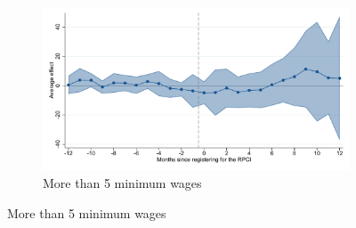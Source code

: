 \begin{figure}[H]
    \begin{subfigure}{0.32\textwidth}
    \caption{More than 5 minimum wages}
    \includegraphics[width=\textwidth]{04_Figures/muestra_10porciento/event_study_sal_cierre_sal_min_5_dcdh_connected.pdf}
    \end{subfigure}
    
\end{figure}

\clearpage

